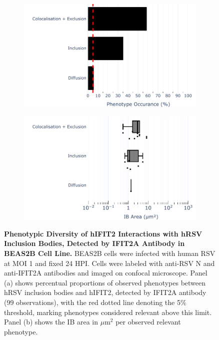 \begin{figure}
    \begin{subfigure}{0.495\textwidth}
        \caption{}
        \includegraphics[width=1\linewidth]{08. Chapter 3/Figs/02. Infection/02. IFIT2/01. IFIT2A/10. bar_i2a_beas2b.pdf} 
    \end{subfigure}
    \begin{subfigure}{0.495\textwidth}
        \caption{}
        \includegraphics[width=1\linewidth]{08. Chapter 3/Figs/02. Infection/02. IFIT2/01. IFIT2A/11. box_i2a_beas2b.pdf}
    \end{subfigure}
    \caption[Phenotypic Diversity of hIFIT2 Interactions with hRSV Inclusion Bodies, Detected by IFIT2A Antibody in BEAS2B Cell Line.]{\textbf{Phenotypic Diversity of hIFIT2 Interactions with hRSV Inclusion Bodies, Detected by IFIT2A Antibody in BEAS2B Cell Line.} BEAS2B cells were infected with human RSV at MOI 1 and fixed 24 HPI. Cells were labeled with anti-RSV N and anti-IFIT2A antibodies and imaged on confocal microscope. Panel (a) shows percentual proportions of observed phenotypes between hRSV inclusion bodies and hIFIT2, detected by IFIT2A antibody (99 observations), with the red dotted line denoting the 5\% threshold, marking phenotypes considered relevant above this limit. Panel (b) shows the IB area in \(\mu \mbox{m}^2\) per observed relevant phenotype.}
    \label{fig:Phenotypic Diversity of hIFIT2 Interactions with hRSV Inclusion Bodies, Detected by IFIT2A Antibody in BEAS2B Cell Line}
\end{figure}

